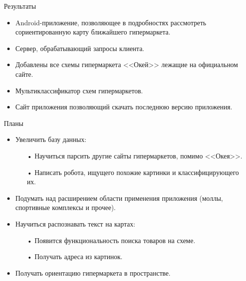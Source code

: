 \documentclass[11pt,slides,aspectratio=43]{beamer}%
\begin{document}
    \begin{frame}{Результаты}
        \begin{itemize}
            \item Android-приложение, позволяющее в подробностях рассмотреть сориентированную карту ближайшего гипермаркета.
            \item Сервер, обрабатывающий запросы клиента.
            \item Добавлены все схемы гипермаркета <<Окей>> лежащие на официальном сайте.
            \item Мультиклассификатор схем гипермаркетов.
            \item Сайт приложения позволяющий скачать последнюю версию приложения.
        \end{itemize}
    \end{frame}


    \begin{frame}{Планы}
        \begin{itemize}
            \item Увеличить базу данных:
            \begin{itemize}
                \item[•] Научиться парсить другие сайты гипермаркетов, помимо <<Окея>>.
                \item[•] Написать робота, ищущего похожие картинки и классифицирующего их.
            \end{itemize}
            \item Подумать над расширением области применения приложения (моллы, спортивные комплексы и прочее).
            \item Научиться распознавать текст на картах:
            \begin{itemize}
                \item[•] Появится функциональность поиска товаров на схеме.
                \item[•] Получать адреса из картинок.
            \end{itemize}
            \item Получать ориентацию гипермаркета в пространстве.
        \end{itemize}
    \end{frame}
\end{document}
